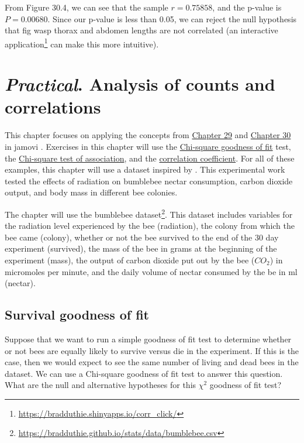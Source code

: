 \documentclass[
  openany]{krantz}
\begin{document}
From Figure 30.4, we can see that the sample \(r = 0.75858\), and the p-value is \(P = 0.00680\).
Since our p-value is less than 0.05, we can reject the null hypothesis that fig wasp thorax and abdomen lengths are not correlated (an interactive application\footnote{\url{https://bradduthie.shinyapps.io/corr_click/}} can make this more intuitive).

\hypertarget{Chapter_31}{%
\chapter{\texorpdfstring{\emph{Practical}. Analysis of counts and correlations}{Practical. Analysis of counts and correlations}}\label{Chapter_31}}

This chapter focuses on applying the concepts from \protect\hyperlink{Chapter_29}{Chapter 29} and \protect\hyperlink{Chapter_30}{Chapter 30} in jamovi \citep{Jamovi2022}.
Exercises in this chapter will use the \protect\hyperlink{chi-squared-goodness-of-fit}{Chi-square goodness of fit} test, the \protect\hyperlink{chi-squared-test-of-association}{Chi-square test of association},
and the \protect\hyperlink{correlation-hypothesis-testing}{correlation coefficient}.
For all of these examples, this chapter will use a dataset inspired by \citet{Burrows2022}.
This experimental work tested the effects of radiation on bumblebee nectar consumption, carbon dioxide output, and body mass in different bee colonies.

The chapter will use the bumblebee dataset\footnote{\url{https://bradduthie.github.io/stats/data/bumblebee.csv}}.
This dataset includes variables for the radiation level experienced by the bee (radiation), the colony from which the bee came (colony), whether or not the bee survived to the end of the 30 day experiment (survived), the mass of the bee in grams at the beginning of the experiment (mass), the output of carbon dioxide put out by the bee (\(CO_2\)) in micromoles per minute, and the daily volume of nectar consumed by the be in ml (nectar).

\hypertarget{survival-goodness-of-fit}{%
\section{Survival goodness of fit}\label{survival-goodness-of-fit}}

Suppose that we want to run a simple goodness of fit test to determine whether or not bees are equally likely to survive versus die in the experiment.
If this is the case, then we would expect to see the same number of living and dead bees in the dataset.
We can use a Chi-square goodness of fit test to answer this question.
What are the null and alternative hypotheses for this \(\chi^{2}\) goodness of fit test?
\end{document}
